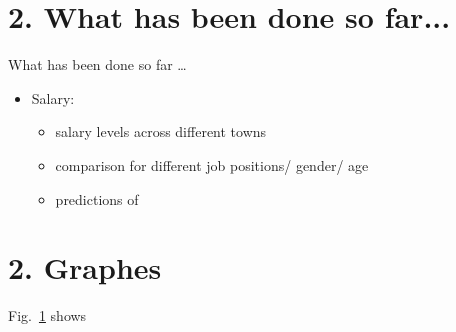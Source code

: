 \documentclass[xcolor=dvipsnames]{beamer}
\begin{document}
\section{2. What has been done so far...}
\begin{frame}{\vskip 0.05cm\centerline{\Huge\textcolor{bscuro}{What has been done so far \ldots}}}
\begin{itemize}
	\item Salary:
	\begin{itemize}
		\item salary levels across different towns
		\item comparison for different job positions/ gender/ age
		\item predictions of 
	\end{itemize}
\end{itemize}
\end{frame}


\section{2. Graphes}
	\begin{frame}
		Fig.~\ref{fig2} shows 
		\begin{figure}[!ht] 
			\centering
			\caption{} 
			\label{fig2}
		\end{figure}
\end{frame}
\end{document}
